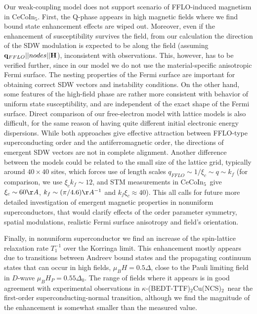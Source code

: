 \documentclass[prb,aps,showpacs,amsmath,twocolumn,10pt]{revtex4-1}
\newcommand{\cecoin}{CeCoIn$_5$}
\newcommand{\kbtf}{$\kappa$-(BEDT-TTF)$_2$Cu(NCS)$_2$}
\begin{document}
Our weak-coupling model does not support scenario of FFLO-induced magnetism in \cecoin. 
First, the Q-phase appears in high magnetic fields\cite{cecoin5_Kenzelmann, cecoin5_Kenzelmann2} 
where we find bound state enhancement effects are wiped out. 
Moreover, even if the enhancement of susceptibility survives the field, 
from our calculation the direction of the SDW modulation is expected to be along the field 
(assuming ${\bf q}_{FFLO} || nodes || {\bf H}$), inconsistent with observations.\cite{Gerber2014}
This, however, has to be verified further, since in our model we do not use the material-specific anisotropic Fermi 
surface. The nesting properties of the Fermi surface are important for obtaining correct SDW vectors and 
instability conditions. 
On the other hand, some features of the high-field phase are rather more consistent with 
behavior of uniform state susceptibility,\cite{sc_afm_kato,Rosemeyer2014} 
and are independent of the exact shape of the Fermi surface. 
%
Direct comparison of our free-electron model with lattice models\cite{Yanase2009abs,Marcin2009} is also difficult, for the 
same reason of having quite different initial electronic energy dispersions. 
While both approaches give effective attraction between FFLO-type  
superconducting order and the antiferromagnetic order, the directions of emergent SDW vectors 
are not in complete alignment. 
Another difference between the models could be related  
to the small size of the lattice grid, typically around $40\times40$ sites, 
which forces use of length scales $q_{FFLO} \sim 1/\xi_c \sim q \sim k_f$ 
(for comparison, we use $\xi_c k_f \sim 12$, and STM measurements\cite{Zhou:2013dq,Allan2013_stm115} in \cecoin\ give 
$\xi_c \sim 60 \AA$, $k_f \sim (\pi/4.6) \AA^{-1}$ and $k_f \xi_c \approx 40$).
This all calls for future more detailed investigation of emergent magnetic properties in nonuniform superconductors, 
that would clarify effects of the order parameter symmetry, spatial modulations, realistic 
Fermi surface anisotropy and field's orientation. 








Finally, in nonuniform superconductor we find an increase of the spin-lattice relaxation rate $T_1^{-1}$ 
over the Korringa limit. This enhancement mostly appears due to transitions 
between Andreev bound states and the propagating continuum states that can occur in high fields, 
$\mu_B H = 0.5 \Delta$, close to the Pauli limiting field in $D$-wave $\mu_B H_P = 0.55 \Delta_0$. 
The range of fields where it appears 
is in good agreement with experimental observations in \kbtf\ near the first-order 
superconducting-normal transition,\cite{Mayaffre2014} 
although we find the magnitude of the enhancement is somewhat smaller than the measured value. 
\end{document}
